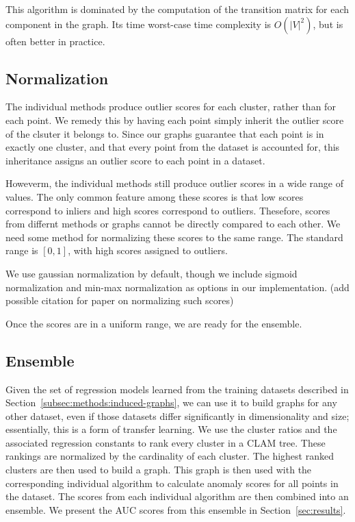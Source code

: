 This algorithm is dominated by the computation of the transition matrix for each component in the graph.
Its time worst-case time complexity is $O(|V|^2)$, but is often better in practice.


\subsection{Normalization}\label{subsec:methods:normalization}
The individual methods produce outlier scores for each cluster, rather than for each point.
We remedy this by having each point simply inherit the outlier score of the clsuter it belongs to.
Since our graphs guarantee that each point is in exactly one cluster, and that every point from the dataset is accounted for, this inheritance assigns an outlier score to each point in a dataset.

Howeverm, the individual methods still produce outlier scores in a wide range of values.
The only common feature among these scores is that low scores correspond to inliers and high scores correspond to outliers.
Thesefore, scores from differnt methods or graphs cannot be directly compared to each other.
We need some method for normalizing these scores to the same range.
The standard range is $[0, 1]$, with high scores assigned to outliers.

We use gaussian normalization by default, though we include sigmoid normalization and min-max normalization as options in our implementation. (add possible citation for paper on normalizing such scores)


Once the scores are in a uniform range, we are ready for the ensemble.


\subsection{Ensemble}\label{subsec:methods:ensemble}
Given the set of regression models learned from the training datasets described in Section~\ref{subsec:methods:induced-graphs}, we can use it to build graphs for any other dataset, even if those datasets differ significantly in dimensionality and size; essentially, this is a form of transfer learning.
We use the cluster ratios and the associated regression constants to rank every cluster in a CLAM tree.
These rankings are normalized by the cardinality of each cluster.
The highest ranked clusters are then used to build a graph.
This graph is then used with the corresponding individual algorithm to calculate anomaly scores for all points in the dataset.
The scores from each individual algorithm are then combined into an ensemble.
We present the AUC scores from this ensemble in Section~\ref{sec:results}.

